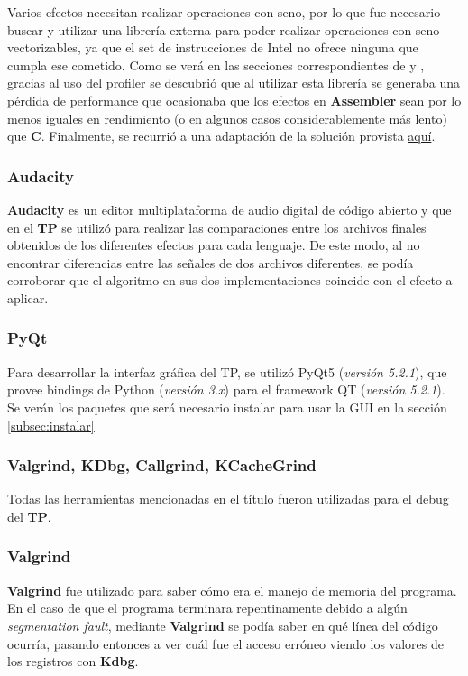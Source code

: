 Varios efectos necesitan realizar operaciones con seno, por lo que fue necesario buscar y utilizar una librería externa para poder realizar operaciones con seno vectorizables, ya que el set de instrucciones de Intel no ofrece ninguna que cumpla ese cometido. Como se verá en las secciones correspondientes de  y , gracias al uso del profiler se descubrió que al utilizar esta librería se generaba una pérdida de performance que ocasionaba que los efectos en \textbf{Assembler} sean por lo menos iguales en rendimiento (o en algunos casos considerablemente más lento) que \textbf{C}. Finalmente, se recurrió a una adaptación de la solución provista \href{http://forum.devmaster.net/t/fast-and-accurate-sine-cosine/9648}{aquí}.

\subsubsection{Audacity}
\label{subsec:audacity}
\textbf{Audacity} es un editor multiplataforma de audio digital de código abierto y que en el \textbf{TP} se utilizó para realizar las comparaciones entre los archivos finales obtenidos de los diferentes efectos para cada lenguaje. De este modo, al no encontrar diferencias entre las señales de dos archivos diferentes, se podía corroborar que el algoritmo en sus dos implementaciones coincide con el efecto a aplicar.

\subsubsection{PyQt}
Para desarrollar la interfaz gráfica del TP, se utilizó PyQt5 (\textit{versión 5.2.1}), que provee bindings de Python (\textit{versión 3.x}) para el framework QT (\textit{versión 5.2.1}). Se verán los paquetes que será necesario instalar para usar la GUI en la sección \ref{subsec:instalar}

\subsubsection{Valgrind, KDbg, Callgrind, KCacheGrind}
Todas las herramientas mencionadas en el título fueron utilizadas para el debug del \textbf{TP}.

\subsubsection*{Valgrind}
\textbf{Valgrind} fue utilizado para saber cómo era el manejo de memoria del programa. En el caso de que el programa terminara repentinamente debido a algún \textit{segmentation fault}, mediante \textbf{Valgrind} se podía saber en qué línea del código ocurría, pasando entonces a ver cuál fue el acceso erróneo viendo los valores de los registros con \textbf{Kdbg}. 

